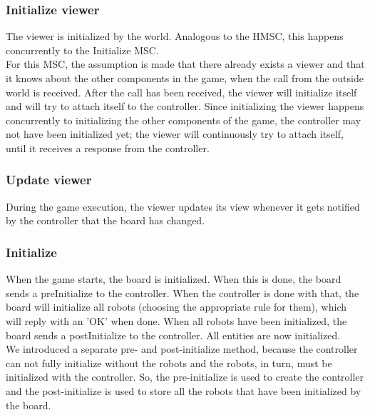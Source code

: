 	\subsubsection{Initialize viewer}
	\begin{minipage}{\linewidth}
		The viewer is initialized by the world. Analogous to the HMSC, this happens concurrently to the Initialize MSC. \\
For this MSC, the assumption is made that there already exists a viewer and that it knows about the other components in the game, when the call from the outside world is received. After the call has been received, the viewer will initialize itself and will try to attach itself to the controller. Since initializing the viewer happens concurrently to initializing the other components of the game, the controller may not have been initialized yet; the viewer will continuously try to attach itself, until it receives a response from the controller.
	
		
	\end{minipage}

    	\subsubsection{Update viewer}
	\begin{minipage}{\linewidth}
		During the game execution, the viewer updates its view whenever it gets notified by the controller that the board has changed.

		
	\end{minipage}

	\subsubsection{Initialize}
	\begin{minipage}{\linewidth}
		When the game starts, the board is initialized. When this is done, the board sends a preInitialize to the controller. When the controller is done with that, the board will initialize all robots (choosing the appropriate rule for them), which will reply with an 'OK' when done. When all robots have been initialized, the board sends a postInitialize to the controller. All entities are now initialized. \\
	We introduced a separate pre- and post-initialize method, because the controller can not fully initialize without the robots and the robots, in turn, must be initialized with the controller. So, the pre-initialize is used to create the controller and the post-initialize is used to store all the robots that have been initialized by the board.

		
    \end{minipage}

